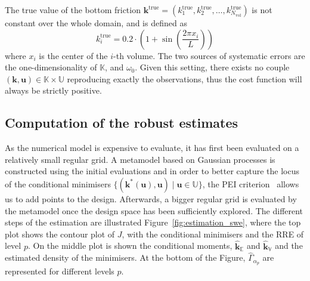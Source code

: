 \documentclass[preprint, 1p]{elsarticle}
\newcommand{\Ex}{\mathbb{E}}
\newcommand{\hatkmean}{\hat{\mathbf{k}}_{\Ex}}
\newcommand{\hatkvar}{\hat{\mathbf{k}}_{\mathbb{V}}}
\newcommand{\RRE}{RRE}
\newcommand{\Kspace}{\mathbb{K}}
\newcommand{\Uspace}{\mathbb{U}}
\begin{document}
The true value of the bottom friction $\mathbf{k}^{\mathrm{true}} = (k_1^{\mathrm{true}}, k_2^{\mathrm{true}},\dots, k_{N_\mathrm{vol}}^{\mathrm{true}})$ is not constant over the whole domain, and is defined as
\begin{equation*}
{k}^{\mathrm{true}}_i = 0.2\cdot \left(1 + \sin\left(\frac{2 \pi x_i}{L}\right)\right)
\end{equation*}
where $x_i$ is the center of the $i$-th volume. The two sources of systematic errors are the one-dimensionality of $\Kspace$, and $\omega_0$.
Given this setting, there exists no couple $(\mathbf{k},\mathbf{u})\in\Kspace \times \Uspace$ reproducing exactly the observations, thus the cost function will always be strictly positive.
\subsection{Computation of the robust estimates}
As the numerical model is expensive to evaluate, it has first been evaluated on a relatively small regular grid. A metamodel based on Gaussian processes is constructed using the initial evaluations and in order to better capture the locus of the conditional minimisers $\{(\mathbf{k}^*(\mathbf{u}), \mathbf{u}) \mid \mathbf{u} \in \Uspace \}$, the PEI criterion~\citep{ginsbourger_bayesian_2014,bossek_learning_2015} allows us to add points to the design. Afterwards, a bigger regular grid is evaluated by the metamodel once the design space has been sufficiently explored. The different steps of the estimation are illustrated Figure~\ref{fig:estimation_swe}, where the top plot shows the contour plot of $J$, with the conditional minimisers and the \RRE{} of level $p$. On the middle plot is shown the conditional moments, $\hatkmean$ and $\hatkvar$ and the estimated density of the minimisers. At the bottom of the Figure, $\hat{\Gamma}_{\alpha_p}$ are represented for different levels $p$.
\end{document}
